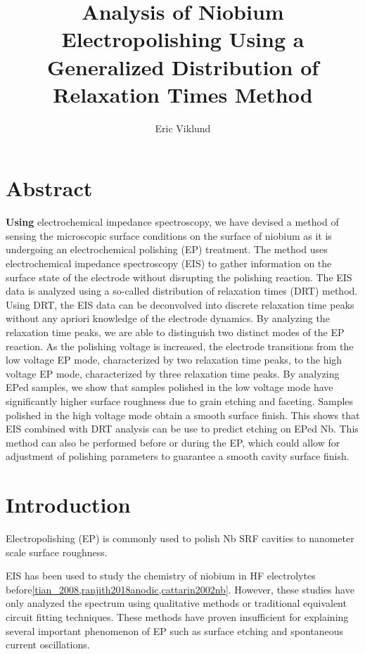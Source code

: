 \documentclass[11pt]{article}
\author{Eric Viklund}
\date{\date}
\title{Analysis of Niobium Electropolishing Using a Generalized Distribution of Relaxation Times Method}
\begin{document}
\maketitle
\tableofcontents


\section{Abstract}
\label{sec:org4ffe8c0}
\textbf{Using} electrochemical impedance spectroscopy, we have devised a method of sensing the microscopic surface conditions on the surface of niobium as it is undergoing an electrochemical polishing (EP) treatment. The method uses electrochemical impedance spectroscopy (EIS) to gather information on the surface state of the electrode without disrupting the polishing reaction. The EIS data is analyzed using a so-called distribution of relaxation times (DRT) method. Using DRT, the EIS data can be deconvolved into discrete relaxation time peaks without any apriori knowledge of the electrode dynamics. By analyzing the relaxation time peaks, we are able to distinguish two distinct modes of the EP reaction. As the polishing voltage is increased, the electrode transitions from the low voltage EP mode, characterized by two relaxation time peaks, to the high voltage EP mode, characterized by three relaxation time peaks. By analyzing EPed samples, we show that samples polished in the low voltage mode have significantly higher surface roughness due to grain etching and faceting. Samples polished in the high voltage mode obtain a smooth surface finish. This shows that EIS combined with DRT analysis can be use to predict etching on EPed Nb. This method can also be performed before or during the EP, which could allow for adjustment of polishing parameters to guarantee a smooth cavity surface finish.

\section{Introduction}
\label{sec:org5ef967f}
Electropolishing (EP) is commonly used to polish Nb SRF cavities to nanometer scale surface roughness. 

EIS has been used to study the chemistry of niobium in HF electrolytes before\ref{tian_2008,ranjith2018anodic,cattarin2002nb}. However, these studies have only analyzed the spectrum using qualitative methods or traditional equivalent circuit fitting techniques. These methods have proven insufficient for explaining several important phenomenon of EP such as surface etching and spontaneous current oscillations.
\end{document}
